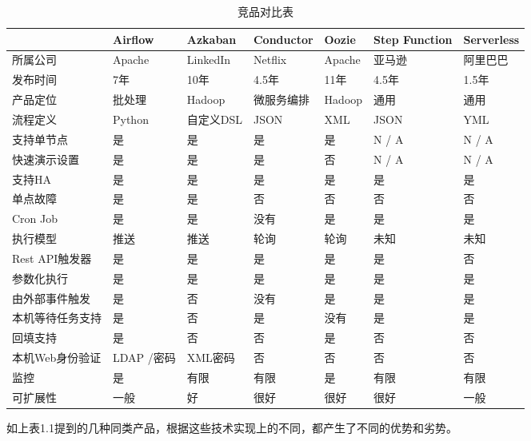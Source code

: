 \begin{table}[H]
\centering
\caption{竞品对比表}
\label{tab:compare-1}
\begin{tabular}{lllllll}
\toprule
&Airflow	&Azkaban	&Conductor	&Oozie	&Step Function	&Serverless \\
\midrule
所属公司& Apache& LinkedIn& Netflix& Apache& 亚马逊& 阿里巴巴 \\
发布时间&	7年&	10年&	4.5年&	11年&	4.5年&	1.5年 \\
产品定位&	批处理&	Hadoop&	微服务编排&	Hadoop&	通用&	通用 \\
流程定义&	Python&	自定义DSL&	JSON&	XML&	JSON&	YML \\
支持单节点&	是&	是&	是&	是&	N / A&	N / A \\
快速演示设置&	是&	是&	是&	否&	N / A&	N / A \\
支持HA&	是&	是&	是&	是&	是&	是 \\
单点故障&	是&	是&	否&	否&	否&	否 \\
Cron Job&	是&	是&	没有&	是&	是&	是 \\
执行模型&	推送&	推送&	轮询&	轮询&	未知&	未知 \\
Rest API触发器&	是&	是&	是&	是&	是&	否 \\
参数化执行&	是&	是&	是&	是&	是&	是 \\
由外部事件触发&	是&	否&	没有&	是&	是&	是 \\
本机等待任务支持&	是&	否&	是&	没有&	是&	是 \\
回填支持&	是&	否&	否&	是&	否&	否 \\
本机Web身份验证&	LDAP /密码&	XML密码&	否&	否&	否&	否 \\
监控&	是&	有限&	有限&	是&	有限&	有限 \\
可扩展性&	一般&	好&	很好&	很好&	很好&	一般\\
\bottomrule
\end{tabular}
\end{table}

如上表1.1提到的几种同类产品，根据这些技术实现上的不同，都产生了不同的优势和劣势。

